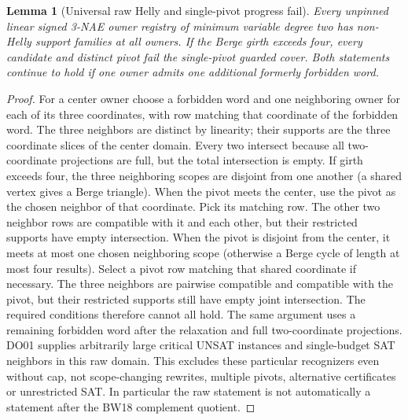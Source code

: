 \documentclass[11pt]{article}
\newtheorem{lemma}[theorem]{Lemma}
\begin{document}
\begin{lemma}[Universal raw Helly and single-pivot progress fail]\label{lem:bh18-stall}
Every unpinned linear signed 3-NAE owner registry of minimum variable degree two has non-Helly support families at all owners. If the Berge girth exceeds four, every candidate and distinct pivot fail the single-pivot guarded cover. Both statements continue to hold if one owner admits one additional formerly forbidden word.
\end{lemma}
\begin{proof}
For a center owner choose a forbidden word and one neighboring owner for each of its three coordinates, with row matching that coordinate of the forbidden word. The three neighbors are distinct by linearity; their supports are the three coordinate slices of the center domain. Every two intersect because all two-coordinate projections are full, but the total intersection is empty. If girth exceeds four, the three neighboring scopes are disjoint from one another (a shared vertex gives a Berge triangle). When the pivot meets the center, use the pivot as the chosen neighbor of that coordinate. Pick its matching row. The other two neighbor rows are compatible with it and each other, but their restricted supports have empty intersection. When the pivot is disjoint from the center, it meets at most one chosen neighboring scope (otherwise a Berge cycle of length at most four results). Select a pivot row matching that shared coordinate if necessary. The three neighbors are pairwise compatible and compatible with the pivot, but their restricted supports still have empty joint intersection. The required conditions therefore cannot all hold. The same argument uses a remaining forbidden word after the relaxation and full two-coordinate projections. DO01 supplies arbitrarily large critical UNSAT instances and single-budget SAT neighbors in this raw domain. This excludes these particular recognizers even without cap, not scope-changing rewrites, multiple pivots, alternative certificates or unrestricted SAT. In particular the raw statement is not automatically a statement after the BW18 complement quotient.
\end{proof}
\end{document}
